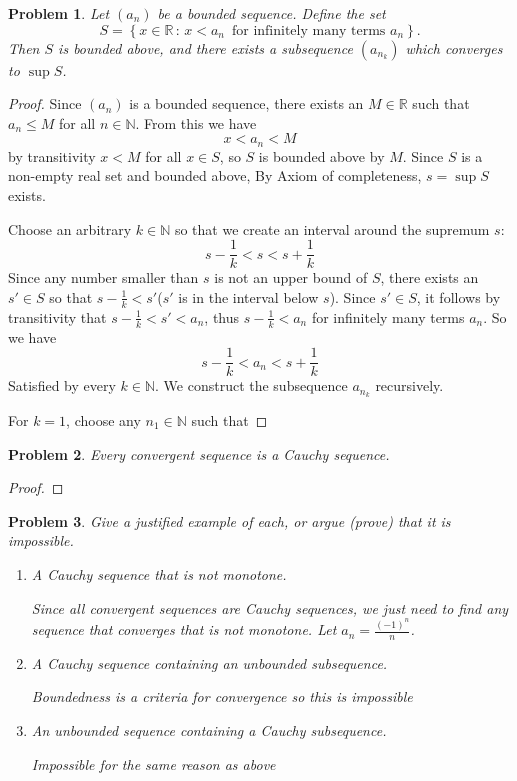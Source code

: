 \documentclass[12pt]{article}
\newtheorem{problem}{Problem}
\newcommand{\NN}{\ensuremath{\mathbb N}}
\newcommand{\RR}{\ensuremath{\mathbb R}}
\begin{document}
\begin{problem} %
Let $(a_n)$ be a bounded sequence.  Define the set
	$$S = \left\{x\in\RR\,:\, x < a_n \,\text{ for infinitely many terms } a_n\right\}.$$
Then $S$ is bounded above, and there exists a subsequence $(a_{n_k})$ which converges to $\sup S$.
\end{problem}
\begin{proof}
Since $(a_n)$ is a bounded sequence, there exists an $M \in \RR$ such that $a_n \leq M$ for all $n \in \NN$. From this we have
$$x < a_n < M$$
by transitivity $x < M$ for all $x \in S$, so $S$ is bounded above by $M$. Since $S$ is a non-empty real set and bounded above, By Axiom of completeness, $s = \sup S$ exists.

Choose an arbitrary $k \in \NN$ so that we create an interval around the supremum $s$: $$s-\frac{1}{k} < s < s+\frac{1}{k}$$ Since any number smaller than $s$ is not an upper bound of $S$, there exists an $s' \in S$ so that $s-\frac{1}{k} < s'$($s'$ is in the interval below $s$). Since $s' \in S$, it follows by transitivity that $s-\frac{1}{k} < s' < a_n$, thus $s-\frac{1}{k} < a_n$ for infinitely many terms $a_n$. So we have $$s-\frac{1}{k} < a_n < s + \frac{1}{k}$$ Satisfied by every $k \in \NN$. We construct the subsequence $a_{n_k}$ recursively.

For $k = 1$, choose any $n_1 \in \NN$ such that 
\end{proof}


\begin{problem} %
Every convergent sequence is a Cauchy sequence.
\end{problem}


\begin{proof}
\end{proof}


\begin{problem} %
Give a justified example of each, or argue (prove) that it is impossible.

\renewcommand{\labelenumi}{(\alph{enumi})}
\begin{enumerate}
\item A Cauchy sequence that is not monotone.

Since all convergent sequences are Cauchy sequences, we just need to find any sequence that converges that is not monotone.
Let $a_n = \frac{(-1)^n}{n}$. 

\item A Cauchy sequence containing an unbounded subsequence.

Boundedness is a criteria for convergence so this is impossible

\item An unbounded sequence containing a Cauchy subsequence.

Impossible for the same reason as above

\end{enumerate}
\end{problem}
\end{document}
